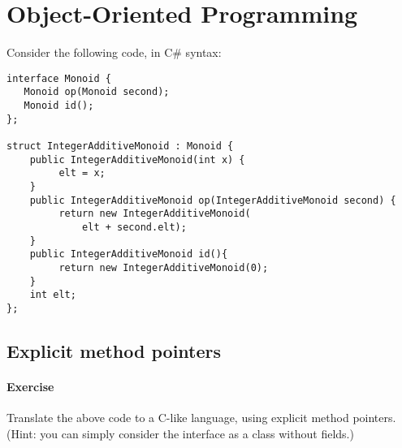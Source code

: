 \documentclass{article}
\newcommand{\percents}[1]{\protect \marginpar[l]{\bf [#1]}}
\newcounter{question}
\newcommand{\question}[1]{
  \addtocounter{question}{1}
  \paragraph{Exercise~\arabic{question}  \percents{#1}}
 }
\begin{document}
\section{Object-Oriented Programming}

Consider the following code, in C\# syntax:
\begin{verbatim}
interface Monoid {
   Monoid op(Monoid second);
   Monoid id();
};

struct IntegerAdditiveMonoid : Monoid {
    public IntegerAdditiveMonoid(int x) {
         elt = x;
    }
    public IntegerAdditiveMonoid op(IntegerAdditiveMonoid second) {
         return new IntegerAdditiveMonoid(
             elt + second.elt);
    }
    public IntegerAdditiveMonoid id(){
         return new IntegerAdditiveMonoid(0);
    }
    int elt;
};

\end{verbatim}
%

\subsection{Explicit method pointers}

\question{*,@2} Translate the above code to a C-like language, using
explicit method pointers. (Hint: you can simply consider the interface
as a class without fields.)
\end{document}
